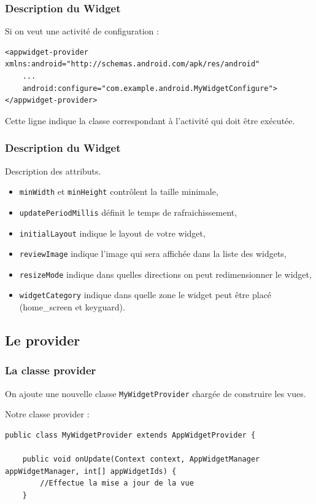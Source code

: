 \documentclass{beamer}
\begin{document}
\begin{frame}[fragile]
\frametitle{Description du Widget}

\begin{exampleblock}{Si on veut une activité de configuration : }
\lstset{language=xml}
\begin{lstlisting}
<appwidget-provider xmlns:android="http://schemas.android.com/apk/res/android"
    ...
    android:configure="com.example.android.MyWidgetConfigure">
</appwidget-provider>
\end{lstlisting}
\end{exampleblock}

\begin{block}{}
Cette ligne indique la classe correspondant à l'activité qui doit être exécutée.
\end{block}
\end{frame}

\begin{frame}
\frametitle{Description du Widget}
\begin{block}{Description des attributs.}
\begin{itemize}
\item \verb!minWidth! et \verb!minHeight! contrôlent la taille minimale,
\item \verb!updatePeriodMillis! définit le temps de rafraichissement,
\item \verb!initialLayout! indique le layout de votre widget,
\item \verb!reviewImage! indique l'image qui sera affichée dans la liste des widgets,
\item \verb!resizeMode! indique dans quelles directions on peut redimensionner le widget,
\item \verb!widgetCategory! indique dans quelle zone le widget peut être placé (home\_screen et keyguard).
\end{itemize}
\end{block}
\end{frame}

\subsection{Le provider}

\begin{frame}[fragile]
\frametitle{La classe provider}
On ajoute une nouvelle classe \verb!MyWidgetProvider! chargée de construire les vues.
\begin{exampleblock}{Notre classe provider :}
\lstset{language=java}
\begin{lstlisting}
public class MyWidgetProvider extends AppWidgetProvider {

    public void onUpdate(Context context, AppWidgetManager appWidgetManager, int[] appWidgetIds) {
        //Effectue la mise a jour de la vue
    }
\end{lstlisting}
\end{exampleblock}
\end{frame}
\end{document}
